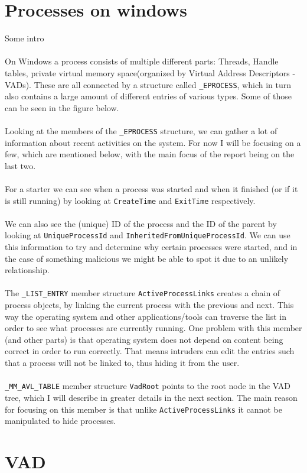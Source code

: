 \documentclass[a4paper]{article}
\begin{document}
\section{Processes on windows}
%
Some intro \\ \\
%
On Windows a process consists of multiple different parts: Threads, Handle tables, private virtual memory space(organized by Virtual Address Descriptors - VADs). These are all connected by a structure called \texttt{\_EPROCESS}, which in turn also contains a large amount of different entries of various types. Some of those can be seen in the figure below. \\ \\
Looking at the members of the \texttt{\_EPROCESS} structure, we can gather a lot of information about recent activities on the system. For now I will be focusing on a few, which are mentioned below, with the main focus of the report being on the last two. \\ \\
%
For a starter we can see when a process was started and when it finished (or if it is still running) by looking at \texttt{CreateTime} and \texttt{ExitTime} respectively. \\ \\
%
We can also see the (unique) ID of the process and the ID of the parent by looking at \texttt{UniqueProcessId} and \texttt{InheritedFromUniqueProcessId}. We can use this information to try and determine why certain processes were started, and in the case of something malicious we might be able to spot it due to an unlikely relationship. \\\\
%
The \texttt{\_LIST\_ENTRY} member structure \texttt{ActiveProcessLinks} creates a chain of process objects, by linking the current process with the previous and next. This way the operating system and other applications/tools can traverse the list in order to see what processes are currently running.  
One problem with this member (and other parts) is that operating system does not depend on content being correct in order to run correctly. That means intruders can edit the entries such that a process will not be linked to, thus hiding it from the user. \\\\
%
\texttt{\_MM\_AVL\_TABLE} member structure \texttt{VadRoot} points to the root node in the VAD tree, which I will describe in greater details in the next section. The main reason for focusing on this member is that unlike \texttt{ActiveProcessLinks} it cannot be manipulated to hide processes. \\


\section{VAD}
\end{document}
